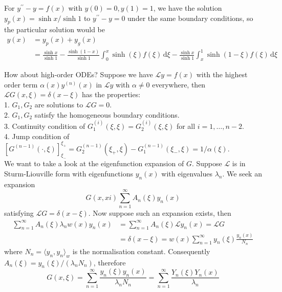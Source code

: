 \begin{example}
    For $y^{\prime\prime}-y=f(x)$ with $y(0)=0,y(1)=1$, we have the solution $y_p(x)=\sinh x/\sinh 1$ to $y^{\prime\prime}-y=0$ under the same boundary conditions, so the particular solution would be
    \begin{align*}
        y(x)&=y_p(x)+y_g(x)\\
        &=\frac{\sinh x}{\sinh 1}-\frac{\sinh(1-x)}{\sinh 1}\int_0^x\sinh(\xi)f(\xi)\,\mathrm d\xi-\frac{\sinh x}{\sinh 1}\int_x^1\sinh(1-\xi)f(\xi)\,\mathrm d\xi
    \end{align*}
\end{example}
How about high-order ODEs?
Suppose we have $\mathcal Ly=f(x)$ with the highest order term $\alpha(x)y^{(n)}(x)$ in $\mathcal Ly$ with $\alpha\neq 0$ everywhere, then $\mathcal LG(x,\xi)=\delta(x-\xi)$ has the properties:\\
1. $G_1,G_2$ are solutions to $\mathcal LG=0$.\\
2. $G_1,G_2$ satisfy the homogeneous boundary conditions.\\
3. Continuity condition of $G_1^{(i)}(\xi,\xi)=G_2^{(i)}(\xi,\xi)$ for all $i=1,\ldots,n-2$.\\
4. Jump condition of $[G^{(n-1)}(\cdot,\xi)]_{\xi_-}^{\xi_+}=G_2^{(n-1)}(\xi_+,\xi)-G_1^{(n-1)}(\xi_-,\xi)=1/\alpha(\xi)$.\\
We want to take a look at the eigenfunction expansion of $G$.
Suppose $\mathcal L$ is in Sturm-Liouville form with eigenfunctions $y_n(x)$ with eigenvalues $\lambda_n$.
We seek an expansion
$$G(x,xi)\sum_{n=1}^\infty A_n(\xi)y_n(x)$$
satisfying $\mathcal LG=\delta(x-\xi)$.
Now suppose such an expansion exists, then
\begin{align*}
    \sum_{n=1}^\infty A_n(\xi)\lambda_nw(x)y_n(x)&=\sum_{n=1}^\infty A_n(\xi)\mathcal Ly_n(x)=\mathcal LG\\
    &=\delta(x-\xi)=w(x)\sum_{n=1}^\infty y_n(\xi)\frac{y_n(x)}{N_n}
\end{align*}
where $N_n=\langle y_n,y_n\rangle_w$ is the normalisation constant.
Consequently $A_n(\xi)=y_n(\xi)/(\lambda_nN_n)$, therefore
$$G(x,\xi)=\sum_{n=1}^\infty\frac{y_n(\xi)y_n(x)}{\lambda_nN_n}=\sum_{n=1}^\infty\frac{Y_n(\xi)Y_n(x)}{\lambda_n}$$

